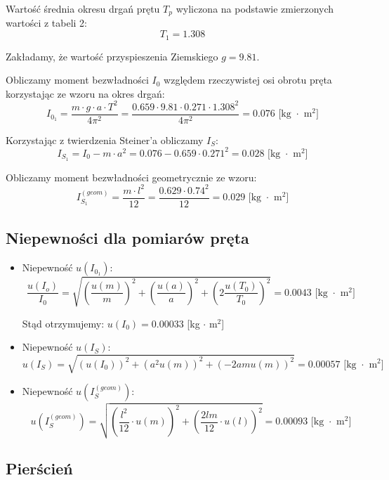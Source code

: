 \documentclass[a4paper,12pts]{article}
\begin{document}
	\flushleft Wartość średnia okresu drgań prętu $T_{p}$ wyliczona na podstawie zmierzonych wartości z tabeli 2: $$T_{1} = 1.308$$
	
	\flushleft Zakładamy, że wartość przyspieszenia Ziemskiego $g = 9.81$.
	
	\flushleft Obliczamy moment bezwładności $I_0$ względem rzeczywistej osi obrotu pręta korzystając ze wzoru na okres drgań:
	$$I_{0_1} = \frac{m \cdot g \cdot a \cdot T^2}{4 \pi^2} = \frac{0.659 \cdot 9.81 \cdot 0.271 \cdot 1.308^2}{4 \pi^2} = 0.076 \textrm{ [kg $\cdot$ m$^2$]}$$ 
	
	\flushleft Korzystając z twierdzenia Steiner'a obliczamy $I_S$:
	$$I_{S_1} = I_0 - m \cdot a^2 = 0.076 - 0.659 \cdot 0.271^2 = 0.028 \textrm{ [kg $\cdot$ m$^2$]}$$
	
	\flushleft Obliczamy moment bezwładności geometrycznie ze wzoru:
	$$I_{S_1}^{(geom)} = \frac{m \cdot l^2}{12} = \frac{0.629 \cdot 0.74^2}{12} = 0.029 \textrm{ [kg $\cdot$ m$^2$]}$$ 
	
	\subsection{Niepewności dla pomiarów pręta}
	
	\begin{itemize}
		\item 
		Niepewność $u(I_{0_1})$:
		$$\frac{u(I_o)}{I_0}=\sqrt{\left (\frac{u(m)}{m}\right ) ^2+\left ( \frac{u(a)}{a}\right )^2+\left (2 \frac{u(T_0)}{T_0}\right )^2} = 0.0043 \textrm{ [kg $\cdot$ m$^2$]}$$
		
		Stąd otrzymujemy: $u(I_0) = 0.00033$ [kg $\cdot$ m$^2$]
		
		\item 
		Niepewność $u(I_S)$:
		$$u(I_S) = \sqrt{(u(I_0))^2 + (a^2u(m))^2 + (-2amu(m))^2} = 0.00057 \textrm{ [kg $\cdot$ m$^2$]}$$
		
		\item 
		Niepewność $u(I_S^{(geom)})$:
		$$u(I_S^{(geom)}) = \sqrt{\left (\frac{l^2}{12} \cdot u(m) \right)^2 + \left (\frac{2lm}{12} \cdot u(l) \right)^2} = 0.00093 \textrm{ [kg $\cdot$ m$^2$]}$$
	\end{itemize}
	
	
	\newpage
	\subsection{Pierścień}
\end{document}
